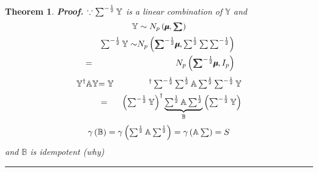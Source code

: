 \documentclass{article}
\newtheorem{theorem}{Theorem}
\newenvironment{proof}[1][Proof]{\noindent\textbf{#1.} }{\ \rule{0.5em}{0.5em}}
\begin{document}
\begin{theorem}
\begin{proof}
$\because \mathop{\textstyle \sum }\nolimits^{-\frac{1}{2}}\mathbb{Y}$ is a linear combination
of $\mathbb{Y}$ and 
\begin{equation*}
\mathbb{Y}\sim N_{p}\left( \mathbb{%
\mu\mkern-12.3mu\mu%
},\mathbb{%
\tsum\mkern-20mu\tsum%
}\right) 
\end{equation*}%
\begin{eqnarray*}
&\therefore &\tsum\nolimits^{-\frac{1}{2}}\mathbb{Y\sim }N_{p}\left( \mathbb{%
\tsum\mkern-20mu\tsum%
}^{-\frac{1}{2}}\mathbb{%
\mu\mkern-12.3mu\mu%
},\tsum\nolimits^{\frac{1}{2}}\tsum \tsum\nolimits^{-\frac{1}{2}}\right)  \\
&=&N_{p}\left( \mathbb{%
\tsum\mkern-20mu\tsum%
}^{-\frac{1}{2}}\mathbb{%
\mu\mkern-12.3mu\mu%
},I_{p}\right) 
\end{eqnarray*}%
\begin{eqnarray*}
\mathbb{Y}^{\mathbb{\dagger }}\mathbb{AY} &\mathbb{=Y}&^{\mathbb{\dagger }%
}\tsum\nolimits^{-\frac{1}{2}}\tsum\nolimits^{\frac{1}{2}}\mathbb{A}%
\tsum\nolimits^{\frac{1}{2}}\tsum\nolimits^{-\frac{1}{2}}\mathbb{Y} \\
&=&\left( \tsum\nolimits^{-\frac{1}{2}}\mathbb{Y}\right) ^{\dagger }\underset%
{\mathbb{B}}{\underbrace{\tsum\nolimits^{\frac{1}{2}}\mathbb{A}%
\tsum\nolimits^{\frac{1}{2}}}}\left( \tsum\nolimits^{-\frac{1}{2}}\mathbb{Y}%
\right) 
\end{eqnarray*}%
\begin{equation*}
\gamma \left( \mathbb{B}\right) =\gamma \left( \tsum\nolimits^{\frac{1}{2}}%
\mathbb{A}\tsum\nolimits^{\frac{1}{2}}\right) =\gamma \left( \mathbb{A}\tsum
\right) =S
\end{equation*}%
and $\mathbb{B}$ is idempotent (why)
\end{proof}
\end{theorem}
\end{document}
